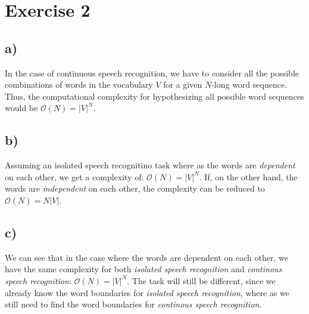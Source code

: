 \section*{Exercise 2} %
\label{sec:section_name}

\subsection*{a)}
\label{sub:subsection_name}

In the case of continuous speech recognition, we have to consider all the possible combinations of words in the vocabulary $V$ for a 
given $N$-long word sequence. 
Thus, the computational complexity for hypothesizing all possible word sequences would be 
$\mathcal{O}(N) = |V|^N$.


\subsection*{b)} %
\label{sub:b}

Assuming an isolated speech recognitino task where as the words are \emph{dependent} on each other, we get a complexity of: 
$\mathcal{O}(N) = |V|^N$.
If, on the other hand, the words are \emph{independent} on each other, the complexity can be reduced to $\mathcal{O}(N) = N|V|$.


\subsection*{c)} %
\label{sub:c}

We can see that in the case where the words are dependent on each other, we have the same complexity for both \emph{isolated 
speech recognition} and \emph{continous speech recognition}: $\mathcal{O}(N) = |V|^N$.
The task will still be different, since we already know the word boundaries for \emph{isolated speech recognition}, where as we 
still need to find the word boundaries for \emph{continous speech recognition}.


